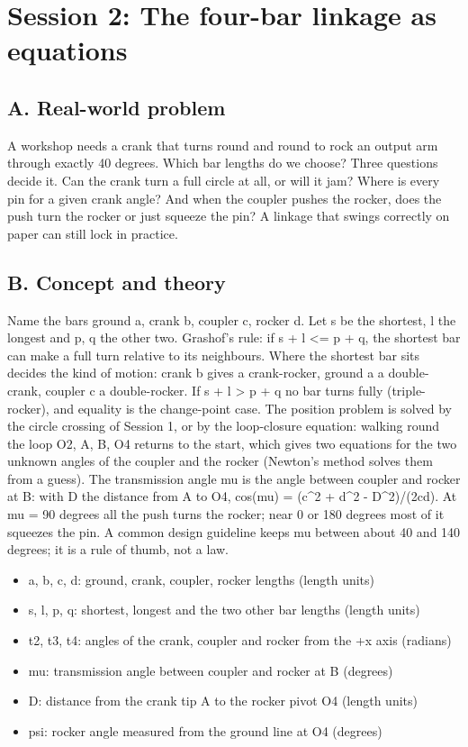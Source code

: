 \documentclass[11pt,a4paper]{article}
\begin{document}
\section{Session 2: The four-bar linkage as equations}

\subsection*{A. Real-world problem}
A workshop needs a crank that turns round and round to rock an output arm through exactly 40 degrees. Which bar lengths do we choose? Three questions decide it. Can the crank turn a full circle at all, or will it jam? Where is every pin for a given crank angle? And when the coupler pushes the rocker, does the push turn the rocker or just squeeze the pin? A linkage that swings correctly on paper can still lock in practice.

\subsection*{B. Concept and theory}
Name the bars ground a, crank b, coupler c, rocker d. Let s be the shortest, l the longest and p, q the other two. Grashof's rule: if s + l \textless{}= p + q, the shortest bar can make a full turn relative to its neighbours. Where the shortest bar sits decides the kind of motion: crank b gives a crank-rocker, ground a a double-crank, coupler c a double-rocker. If s + l \textgreater{} p + q no bar turns fully (triple-rocker), and equality is the change-point case. The position problem is solved by the circle crossing of Session 1, or by the loop-closure equation: walking round the loop O2, A, B, O4 returns to the start, which gives two equations for the two unknown angles of the coupler and the rocker (Newton's method solves them from a guess). The transmission angle mu is the angle between coupler and rocker at B: with D the distance from A to O4, cos(mu) = (c\textasciicircum{}2 + d\textasciicircum{}2 - D\textasciicircum{}2)/(2cd). At mu = 90 degrees all the push turns the rocker; near 0 or 180 degrees most of it squeezes the pin. A common design guideline keeps mu between about 40 and 140 degrees; it is a rule of thumb, not a law.

\begin{itemize}[nosep]
\item a, b, c, d: ground, crank, coupler, rocker lengths (length units)
\item s, l, p, q: shortest, longest and the two other bar lengths (length units)
\item t2, t3, t4: angles of the crank, coupler and rocker from the +x axis (radians)
\item mu: transmission angle between coupler and rocker at B (degrees)
\item D: distance from the crank tip A to the rocker pivot O4 (length units)
\item psi: rocker angle measured from the ground line at O4 (degrees)
\end{itemize}
\end{document}
